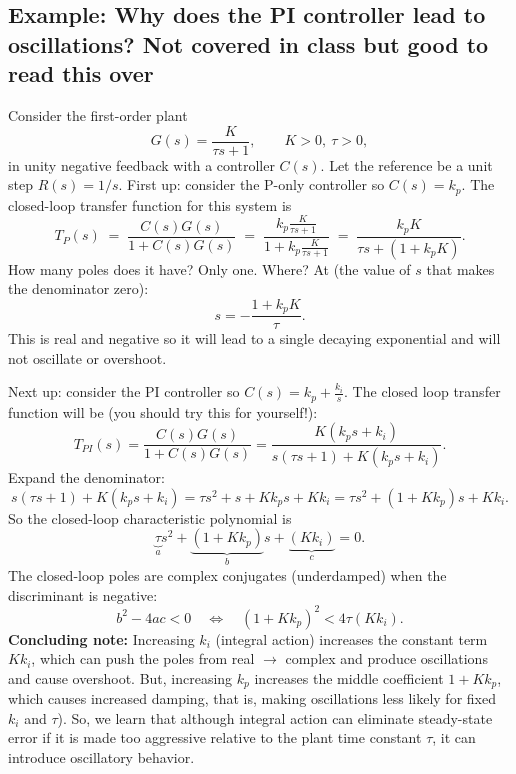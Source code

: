\documentclass{ee122_notes}
\begin{document}
\subsection{Example: Why does the PI controller lead to oscillations? {\color{blue} Not covered in class but good to read this over}}
Consider the first-order plant
    \[
        G(s) = \frac{K}{\tau s + 1}, \qquad K>0,\ \tau>0,
    \]
    in unity negative feedback with a controller \(C(s)\). Let the reference be a unit step \(R(s)=1/s\). First up: consider the P-only controller so \(C(s)=k_p\). The closed-loop transfer function for this system is
        \[
            T_P(s) \;=\; \frac{C(s)G(s)}{1+C(s)G(s)}
            \;=\; \frac{k_p \frac{K}{\tau s+1}}{1+k_p \frac{K}{\tau s+1}}
            \;=\; \frac{k_p K}{\tau s + (1+k_p K)}.
        \]
        How many poles does it have? Only one. Where? At (the value of $s$ that makes the denominator zero):
        \[
            s = -\frac{1+k_p K}{\tau}.
        \]
        This is real and negative so it will lead to a single decaying exponential and will not oscillate or overshoot.

Next up: consider the PI controller so \(C(s)=k_p+\frac{k_i}{s}\). The closed loop transfer function will be (you should try this for yourself!):
        \[
            T_{PI}(s)
            = \frac{C(s)G(s)}{1+C(s)G(s)}
            = \frac{K(k_p s + k_i)}{s(\tau s+1)+K(k_p s+k_i)}.
        \]
        Expand the denominator:
        \[
            s(\tau s+1)+K(k_p s+k_i)
            = \tau s^2 + s + Kk_p s + Kk_i
            = \tau s^2 + (1+Kk_p)s + Kk_i.
        \]
        So the closed-loop characteristic polynomial is
        \[
            \underbrace{\tau}_{a}s^2 + \underbrace{(1+Kk_p)}_{b}s + \underbrace{(Kk_i)}_{c} = 0.
        \]
        The closed-loop poles are complex conjugates (underdamped) when the discriminant is negative:
        \[
            b^2 - 4ac < 0
            \quad\Longleftrightarrow\quad
            (1+Kk_p)^2 < 4\tau(Kk_i).
        \]
\textbf{Concluding note:} Increasing \(k_i\) (integral action) increases the constant term \(Kk_i\), which can push the poles from real \(\rightarrow\) complex and produce oscillations and cause overshoot. But, increasing \(k_p\) increases the middle coefficient \(1+Kk_p\), which causes increased damping, that is, making oscillations less likely for fixed \(k_i\) and \(\tau\)). So, we learn that although integral action can eliminate steady-state error if it is made too aggressive relative to the plant time constant \(\tau\), it can introduce oscillatory behavior.
    
\end{document}
